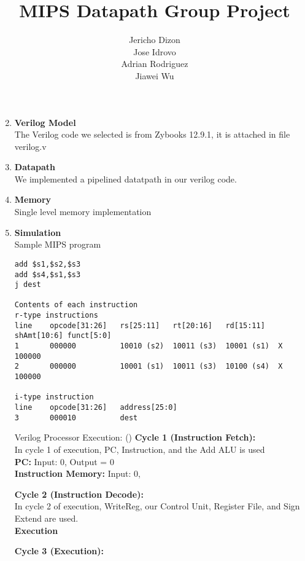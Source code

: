 \documentclass{article}
\author{Jericho Dizon\\Jose Idrovo\\Adrian Rodriguez\\Jiawei Wu}
\title{\textbf{MIPS Datapath Group Project}}
\begin{document}
     \begin{titlepage}
        \maketitle
     \end{titlepage}

     \begin{enumerate}
        \setcounter{enumi}{1}
        \item \textbf{Verilog Model}
        \\ The Verilog code we selected is from Zybooks 12.9.1, it is attached in file verilog.v
        \item \textbf{Datapath}
        \\ We implemented a pipelined datatpath in our verilog code.
        \item \textbf{Memory}
        \\ Single level memory implementation
        \item \textbf{Simulation}
        \\ Sample MIPS program 
        \begin{verbatim}
add $s1,$s2,$s3
add $s4,$s1,$s3
j dest

Contents of each instruction
r-type instructions
line    opcode[31:26]   rs[25:11]   rt[20:16]   rd[15:11]   shAmt[10:6] funct[5:0]
1       000000          10010 (s2)  10011 (s3)  10001 (s1)  X           100000
2       000000          10001 (s1)  10011 (s3)  10100 (s4)  X           100000

i-type instruction
line    opcode[31:26]   address[25:0]
3       000010          dest
        \end{verbatim}

        Verilog Processor Execution: ()
        \textbf{Cycle 1 (Instruction Fetch):}
        \\ In cycle 1 of execution, PC, Instruction, and the Add ALU is used
        \\ \textbf{PC: } Input: 0, Output = 0
        \\ \textbf{Instruction Memory: } Input: 0, 

        \textbf{Cycle 2 (Instruction Decode):}
        \\ In cycle 2 of execution, WriteReg, our Control Unit, Register File, and Sign Extend are used. 
        \\ \textbf{Execution}

        \textbf{Cycle 3 (Execution):}


\end{enumerate}
\end{document}

